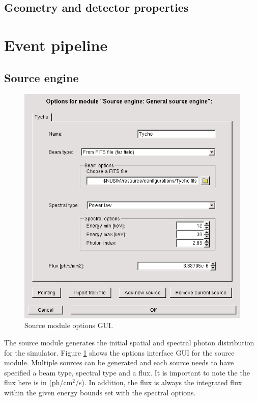 \subsection{Geometry and detector properties} 

\section{Event pipeline}

\subsection{Source engine}
\begin{figure}[tb]
\begin{center}
\includegraphics[scale=0.5]{images/sourceGUI.png}  
\caption{Source module options GUI.}
\label{sourcegui} 
\end{center}
\end{figure}
The source module generates the initial spatial and spectral photon distribution for the simulator. Figure \ref{sourcegui} shows the options interface GUI for the source module. Multiple sources can be generated and each source needs to have specified a beam type, spectral type and a flux. It is important to note the the flux here is in (ph/cm$^2$/s). In addition, the flux is always the integrated flux within the given energy bounds set with the spectral options.  


